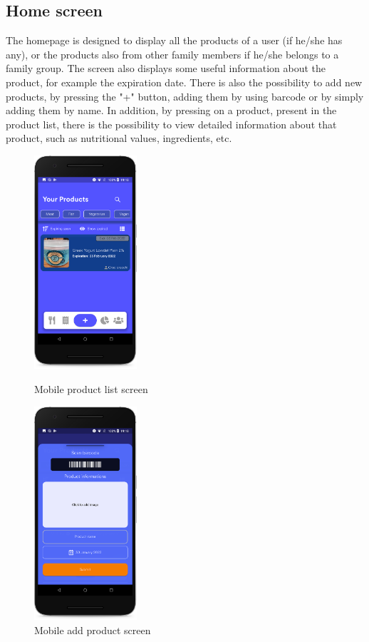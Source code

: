 \subsection{Home screen}
The homepage is designed to display all the products of a user (if he/she has any), or the products also from other family members if he/she belongs to a family group.
The screen also displays some useful information about the product, for example the expiration date.
There is also the possibility to add new products, by pressing the "+" button, adding them by using barcode or by simply adding them by name.
In addition, by pressing on a product, present in the product list, there is the possibility to view detailed information about that product, such as nutritional values, ingredients, etc.


\vspace*{1cm}
\begin{figure}[H]
  \begin{minipage}{0.5\textwidth}
  \centering
    \includegraphics[width=38mm,scale=0.9]{./Images//Mobile_mocks/home1.png}
    \vspace*{-0.3cm}
    \caption{Mobile product list screen}
    \end{minipage}
\hfill
   \begin{minipage}{0.5\textwidth}
     \centering
     \includegraphics[width=38mm,scale=0.9]{./Images//Mobile_mocks/home2.png}
     \vspace*{-0.3cm}
     \caption{Mobile add product screen}
   \end{minipage}
\end{figure}

